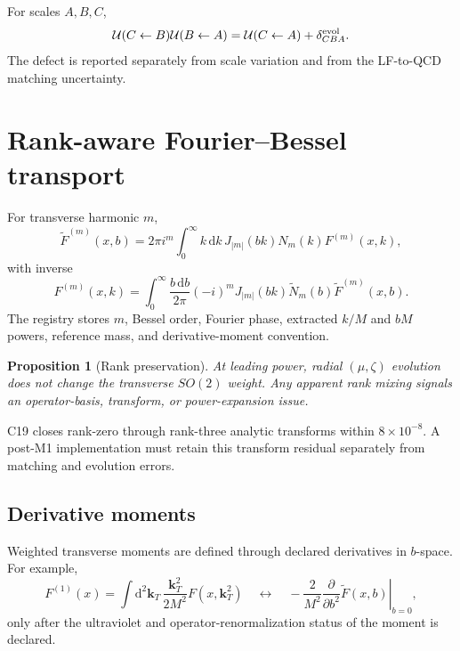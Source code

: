 \documentclass[11pt]{article}
\newtheorem{proposition}[definition]{Proposition}
\newcommand{\dd}{\mathrm{d}}
\newcommand{\kT}{\bm k_T}
\newcommand{\cU}{\mathcal U}
\begin{document}
For scales \(A,B,C\),
\begin{equation}
 \cU(C\leftarrow B)\cU(B\leftarrow A)
 =
 \cU(C\leftarrow A)
 +\delta_{CBA}^{\rm evol}.
 \label{eq:evolution-transitivity}
\end{equation}
The defect is reported separately from scale variation and from the LF-to-QCD matching uncertainty.

\section{Rank-aware Fourier--Bessel transport}
\label{sec:rank}

For transverse harmonic \(m\),
\begin{equation}
 \widetilde F^{(m)}(x,b)
 =
 2\pi i^m
 \int_0^\infty k\,\dd k\,
 J_{|m|}(bk)
 N_m(k)
 F^{(m)}(x,k),
 \label{eq:rank-forward}
\end{equation}
with inverse
\begin{equation}
 F^{(m)}(x,k)
 =
 \int_0^\infty\frac{b\,\dd b}{2\pi}
 (-i)^m
 J_{|m|}(bk)
 \widetilde N_m(b)
 \widetilde F^{(m)}(x,b).
 \label{eq:rank-inverse}
\end{equation}
The registry stores \(m\), Bessel order, Fourier phase, extracted \(k/M\) and \(bM\) powers, reference mass, and derivative-moment convention.

\begin{proposition}[Rank preservation]
At leading power, radial \((\mu,\zeta)\) evolution does not change the transverse \(SO(2)\) weight.  Any apparent rank mixing signals an operator-basis, transform, or power-expansion issue.
\end{proposition}

C19 closes rank-zero through rank-three analytic transforms within \(8\times10^{-8}\).  A post-M1 implementation must retain this transform residual separately from matching and evolution errors.

\subsection{Derivative moments}

Weighted transverse moments are defined through declared derivatives in \(b\)-space.  For example,
\begin{equation}
 F^{(1)}(x)
 =
 \int \dd^2\kT\,
 \frac{\kT^2}{2M^2}F(x,\kT^2)
 \quad\longleftrightarrow\quad
 -\frac{2}{M^2}
 \left.\frac{\partial}{\partial b^2}
 \widetilde F(x,b)\right|_{b=0},
 \label{eq:derivative-moment}
\end{equation}
only after the ultraviolet and operator-renormalization status of the moment is declared.
\end{document}

